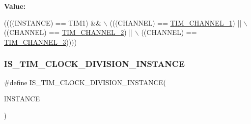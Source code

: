 {\bfseries Value\+:}
\begin{DoxyCode}
((((INSTANCE) == TIM1) &&                    \(\backslash\)
     (((CHANNEL) == \hyperlink{group___t_i_m___channel_ga6b1541e4a49d62610899e24bf23f4879}{TIM\_CHANNEL\_1}) ||           \(\backslash\)
      ((CHANNEL) == \hyperlink{group___t_i_m___channel_ga33e02d43345a7ac5886f01b39e4f7ccd}{TIM\_CHANNEL\_2}) ||           \(\backslash\)
      ((CHANNEL) == \hyperlink{group___t_i_m___channel_ga4ea100c1789b178f3cb46721b7257e2d}{TIM\_CHANNEL\_3}))))
\end{DoxyCode}
\mbox{\label{group___exported__macros_gac54b9f42e8ab07c41abe7d96d13d698a}} 
\subsubsection{\texorpdfstring{I\+S\+\_\+\+T\+I\+M\+\_\+\+C\+L\+O\+C\+K\+\_\+\+D\+I\+V\+I\+S\+I\+O\+N\+\_\+\+I\+N\+S\+T\+A\+N\+CE}{IS\_TIM\_CLOCK\_DIVISION\_INSTANCE}}
{\footnotesize\ttfamily \#define I\+S\+\_\+\+T\+I\+M\+\_\+\+C\+L\+O\+C\+K\+\_\+\+D\+I\+V\+I\+S\+I\+O\+N\+\_\+\+I\+N\+S\+T\+A\+N\+CE(\begin{DoxyParamCaption}\item[{}]{I\+N\+S\+T\+A\+N\+CE }\end{DoxyParamCaption})}

